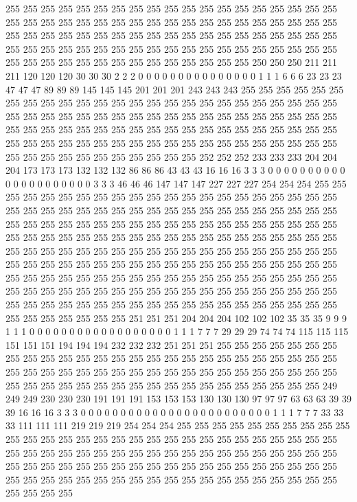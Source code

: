255 255 255 255 255 255 255 255 255 255 255 255 255 255 255 255 255 255 255 255 255 255 255 255 255 255 255 255 255 255 255 255 255 255 255 255 255 255 255 255 255 255 255 255 255 255 255 255 255 255 255 255 255 255 255 255 255 255 255 255 255 255 255 255 255 255 255 255 255 255 255 255 255 255 255 255 255 255 255 255 255 255 255 255 255 255 255 255 255 255 250 250 250 211 211 211 120 120 120 30 30 30 2 2 2 0 0 0 0 0 0 0 0 0 0 0 0 0 0 0 1 1 1 6 6 6 23 23 
23 47 47 47 89 89 89 145 145 145 201 201 201 243 243 243 255 255 255 255 255 255 255 255 255 255 255 255 255 255 255 255 255 255 255 255 255 255 255 255 255 255 255 255 255 255 255 255 255 255 255 255 255 255 255 255 255 255 255 255 255 255 255 255 255 255 255 255 255 255 255 255 255 255 255 255 255 255 255 255 255 255 255 255 255 255 255 255 255 255 255 255 255 255 255 255 255 255 255 255 255 255 255 255 255 255 255 255 255 252 252 252 233 233 233 204 204 204 173 173 173 132 132 132 86 86 86 43 
43 43 16 16 16 3 3 3 0 0 0 0 0 0 0 0 0 0 0 0 0 0 0 0 0 0 0 0 0 3 3 3 46 46 46 147 147 147 227 227 227 254 254 254 255 255 255 255 255 255 255 255 255 255 255 255 255 255 255 255 255 255 255 255 255 255 255 255 255 255 255 255 255 255 255 255 255 255 255 255 255 255 255 255 255 255 255 255 255 255 255 255 255 255 255 255 255 255 255 255 255 255 255 255 255 255 255 255 255 255 255 255 255 255 255 255 255 255 255 255 255 255 255 255 255 255 255 255 
255 255 255 255 255 255 255 255 255 255 255 255 255 255 255 255 255 255 255 255 255 255 255 255 255 255 255 255 255 255 255 255 255 255 255 255 255 255 255 255 255 255 255 255 255 255 255 255 255 255 255 255 255 255 255 255 255 255 255 255 255 255 255 255 255 255 255 255 255 255 255 255 255 255 255 255 255 255 255 255 255 255 255 255 255 255 255 255 255 255 255 255 255 255 255 255 251 251 251 204 204 204 102 102 102 35 35 35 9 9 9 1 1 1 0 0 0 0 0 0 0 0 0 0 0 0 0 0 
0 0 0 0 1 1 1 7 7 7 29 29 29 74 74 74 115 115 115 151 151 151 194 194 194 232 232 232 251 251 251 255 255 255 255 255 255 255 255 255 255 255 255 255 255 255 255 255 255 255 255 255 255 255 255 255 255 255 255 255 255 255 255 255 255 255 255 255 255 255 255 255 255 255 255 255 255 255 255 255 255 255 255 255 255 255 255 255 255 255 255 255 255 255 249 249 249 230 230 230 191 191 191 153 153 153 130 130 130 97 97 97 63 63 63 39 39 39 16 16 16 3 3 3 0 0 0 0 
0 0 0 0 0 0 0 0 0 0 0 0 0 0 0 0 0 0 0 0 1 1 1 7 7 7 33 33 33 111 111 111 219 219 219 254 254 254 255 255 255 255 255 255 255 255 255 255 255 255 255 255 255 255 255 255 255 255 255 255 255 255 255 255 255 255 255 255 255 255 255 255 255 255 255 255 255 255 255 255 255 255 255 255 255 255 255 255 255 255 255 255 255 255 255 255 255 255 255 255 255 255 255 255 255 255 255 255 255 255 255 255 255 255 255 255 255 255 255 255 255 255 255 255 255 255 255 255 
